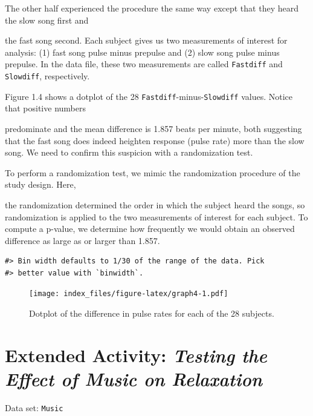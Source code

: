 \documentclass[
]{report}
\begin{document}
The other half experienced the procedure the same way except that they heard the slow song first and

the fast song second.
\textbar{} Each subject gives us two measurements of interest for analysis: (1) fast song pulse minus prepulse
and (2) slow song pulse minus prepulse. In the data file, these two measurements are called \texttt{Fastdiff} and
\texttt{Slowdiff}, respectively.

Figure 1.4 shows a dotplot of the 28 \texttt{Fastdiff}-minus-\texttt{Slowdiff} values. Notice that positive numbers

predominate and the mean difference is 1.857 beats per minute, both suggesting that the fast song does indeed
heighten response (pulse rate) more than the slow song. We need to confirm this suspicion with a randomization
test.

To perform a randomization test, we mimic the randomization procedure of the study design. Here,

the randomization determined the order in which the subject heard the songs, so randomization is applied
to the two measurements of interest for each subject. To compute a p-value, we determine how frequently
we would obtain an observed difference as large as or larger than 1.857.

\begin{verbatim}
#> Bin width defaults to 1/30 of the range of the data. Pick
#> better value with `binwidth`.
\end{verbatim}

\begin{figure}
\centering
\texttt{[image: index\_files/figure-latex/graph4-1.pdf]}
\caption{\label{fig:graph4}Dotplot of the difference in pulse rates for each of the 28 subjects.}
\end{figure}

\section*{\texorpdfstring{Extended Activity: \emph{Testing the Effect of Music on Relaxation}}{Extended Activity: Testing the Effect of Music on Relaxation}}\label{extended-activity-testing-the-effect-of-music-on-relaxation}

Data set: \texttt{Music}
\end{document}
